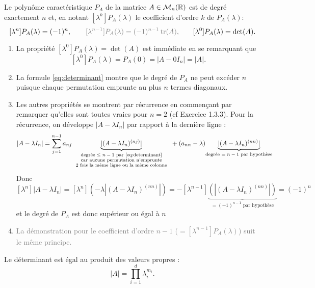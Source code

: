 \begin{theorem*}
  Le polynôme caractéristique $P_A$ de la matrice $A \in \mathcal{M}_n(\mathbb{R})$ est de degré exactement $n$ et, en notant $[\lambda^k]P_A(\lambda)$ le coefficient d'ordre $k$ de $P_A(\lambda)$:
  $$
  [\lambda^n]P_A(\lambda) = (-1)^n, \qquad
  \textcolor{gray}{[\lambda^{n-1}]P_A(\lambda) = (-1)^{n-1} \tr(A), \qquad}
  [\lambda^0]P_A(\lambda) = \det(A).
  $$
\end{theorem*}

\proof
\begin{enumerate}[\itemdot]
 \item La propriété $[\lambda^0]P_A(\lambda) = \det(A)$ est immédiate en se remarquant que
$$
[\lambda^0]P_A(\lambda) = P_A(0) = |A - 0 I_n| = |A|.
$$
\item La formule \eqref{eq:determinant} montre que le degré de $P_A$ ne peut excéder $n$ puisque chaque permutation emprunte au plus $n$ termes diagonaux.
\item Les autres propriétés se montrent par récurrence en commençant par remarquer qu'elles sont toutes vraies pour $n = 2$ (cf Exercice 1.3.3). Pour la récurrence, on développe $|A - \lambda I_n|$ par rapport à la dernière ligne : 
$$
|A - \lambda I_n| 
= \sum_{j=1}^{n-1} a_{nj} \underset{\scriptsize
  \begin{tabular}{c}\text{degrée $\leq n-1$ par \eqref{eq:determinant}} \\
  \text{car aucune permutation n'emprunte} \\
  \text{2 fois la même ligne ou la même colonne}\end{tabular}
  }{\underbrace{|(A - \lambda I_n)^{(nj)}|}} + (a_{nn} - \lambda) \underset{\text{degrée $= n-1$ par hypothèse}}{\underbrace{|(A - \lambda I_n)^{(nn)}|}}
$$
Donc
$$
[\lambda^n]|A - \lambda I_n| 
= [\lambda^n](-\lambda |(A - \lambda I_n)^{(nn)}|) 
= - [\lambda^{n-1}]\underset{\text{$= (-1)^{n-1}$ par hypothèse}}{\underbrace{(|(A - \lambda I_n)^{(nn)}|)}}
= (-1)^n
$$
et le degré de $P_A$ est donc supérieur ou égal à $n$
\item \textcolor{gray}{La démonstration pour le coefficient d'ordre $n-1$ ($= [\lambda^{n-1}]P_A(\lambda)$) suit le même principe.}
\end{enumerate}
\eproof

\begin{corollary*}
  Le déterminant est égal au produit des valeurs propres : 
  $$
  |A| = \prod_{i=1}^d \lambda_i^{m_i}.
  $$
\end{corollary*}


